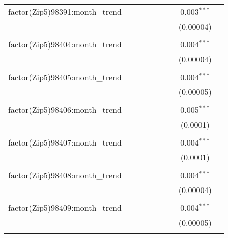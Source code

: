 \begin{table}[H]
{\begin{tabular}{@{\extracolsep{5pt}}lcccccccc}
  factor(Zip5)98391:month\_trend &  &  &  &  &  &  & 0.003$^{***}$ &  \\  

   &  &  &  &  &  &  & (0.00004) &  \\  

   & & & & & & & & \\  

  factor(Zip5)98404:month\_trend &  &  &  &  &  &  & 0.004$^{***}$ &  \\  

   &  &  &  &  &  &  & (0.00004) &  \\  

   & & & & & & & & \\  

  factor(Zip5)98405:month\_trend &  &  &  &  &  &  & 0.004$^{***}$ &  \\  

   &  &  &  &  &  &  & (0.00005) &  \\  

   & & & & & & & & \\  

  factor(Zip5)98406:month\_trend &  &  &  &  &  &  & 0.005$^{***}$ &  \\  

   &  &  &  &  &  &  & (0.0001) &  \\  

   & & & & & & & & \\  

  factor(Zip5)98407:month\_trend &  &  &  &  &  &  & 0.004$^{***}$ &  \\  

   &  &  &  &  &  &  & (0.0001) &  \\  

   & & & & & & & & \\  

  factor(Zip5)98408:month\_trend &  &  &  &  &  &  & 0.004$^{***}$ &  \\  

   &  &  &  &  &  &  & (0.00004) &  \\  

   & & & & & & & & \\  

  factor(Zip5)98409:month\_trend &  &  &  &  &  &  & 0.004$^{***}$ &  \\  

   &  &  &  &  &  &  & (0.00005) &  \\  

   & & & & & & & & \\  


\end{tabular}}
\end{table}
